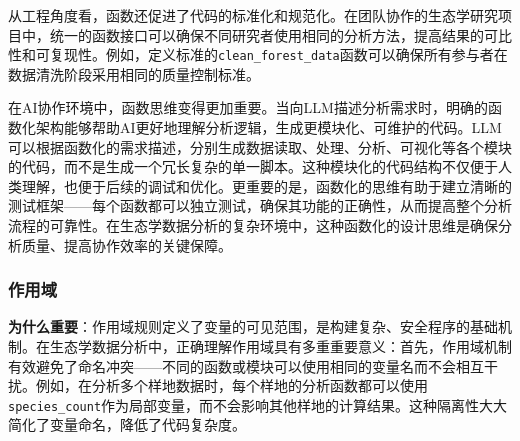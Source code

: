 \documentclass[
  twoside]{book}
\newenvironment{Shaded}{\begin{snugshade}}{\end{snugshade}}
\newcommand{\CommentTok}[1]{\textcolor[rgb]{0.56,0.35,0.01}{\textit{#1}}}
\newcommand{\ControlFlowTok}[1]{\textcolor[rgb]{0.13,0.29,0.53}{\textbf{#1}}}
\newcommand{\DecValTok}[1]{\textcolor[rgb]{0.00,0.00,0.81}{#1}}
\newcommand{\FunctionTok}[1]{\textcolor[rgb]{0.13,0.29,0.53}{\textbf{#1}}}
\newcommand{\NormalTok}[1]{#1}
\newcommand{\OtherTok}[1]{\textcolor[rgb]{0.56,0.35,0.01}{#1}}
\newcommand{\SpecialCharTok}[1]{\textcolor[rgb]{0.81,0.36,0.00}{\textbf{#1}}}
\begin{document}
从工程角度看，函数还促进了代码的标准化和规范化。在团队协作的生态学研究项目中，统一的函数接口可以确保不同研究者使用相同的分析方法，提高结果的可比性和可复现性。例如，定义标准的\texttt{clean\_forest\_data}函数可以确保所有参与者在数据清洗阶段采用相同的质量控制标准。

在AI协作环境中，函数思维变得更加重要。当向LLM描述分析需求时，明确的函数化架构能够帮助AI更好地理解分析逻辑，生成更模块化、可维护的代码。LLM可以根据函数化的需求描述，分别生成数据读取、处理、分析、可视化等各个模块的代码，而不是生成一个冗长复杂的单一脚本。这种模块化的代码结构不仅便于人类理解，也便于后续的调试和优化。更重要的是，函数化的思维有助于建立清晰的测试框架------每个函数都可以独立测试，确保其功能的正确性，从而提高整个分析流程的可靠性。在生态学数据分析的复杂环境中，这种函数化的设计思维是确保分析质量、提高协作效率的关键保障。

\hypertarget{ux4f5cux7528ux57df}{%
\subsubsection{作用域}\label{ux4f5cux7528ux57df}}

\begin{Shaded}
\end{Shaded}

\textbf{为什么重要}：作用域规则定义了变量的可见范围，是构建复杂、安全程序的基础机制。在生态学数据分析中，正确理解作用域具有多重重要意义：首先，作用域机制有效避免了命名冲突------不同的函数或模块可以使用相同的变量名而不会相互干扰。例如，在分析多个样地数据时，每个样地的分析函数都可以使用\texttt{species\_count}作为局部变量，而不会影响其他样地的计算结果。这种隔离性大大简化了变量命名，降低了代码复杂度。
\end{document}
